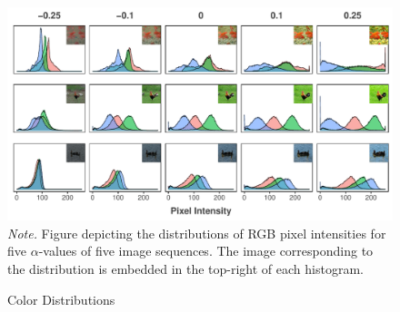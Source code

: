 \documentclass[../main.tex]{subfiles}
\begin{document}
\begin{figure}[!h]
	\caption{Color Distributions}
	\label{fig:col_dists}
	\includegraphics[width=1\linewidth]{images/results/col_dists_edit.pdf}
	{\textit{Note.} Figure depicting the distributions of RGB pixel intensities for five $\alpha$-values of five image sequences. The image corresponding to the distribution is embedded in the top-right of each histogram.}
\end{figure}
\end{document}
